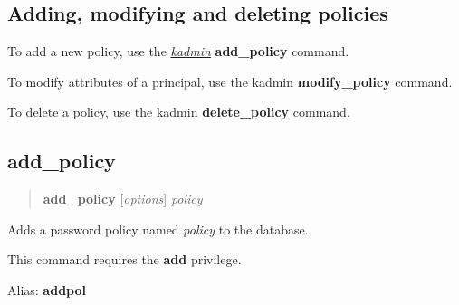 \documentclass[letterpaper,10pt,english]{sphinxmanual}
\begin{document}
\subsection{Adding, modifying and deleting policies}
\label{admin/database:adding-modifying-and-deleting-policies}
To add a new policy, use the {\hyperref[admin/admin_commands/kadmin_local:kadmin-1]{\emph{kadmin}}} \textbf{add\_policy} command.

To modify attributes of a principal, use the kadmin \textbf{modify\_policy}
command.

To delete a policy, use the kadmin \textbf{delete\_policy} command.


\subsection{add\_policy}
\label{admin/database:add-policy}\begin{quote}

\textbf{add\_policy} {[}\emph{options}{]} \emph{policy}
\end{quote}

Adds a password policy named \emph{policy} to the database.

This command requires the \textbf{add} privilege.

Alias: \textbf{addpol}
\end{document}
